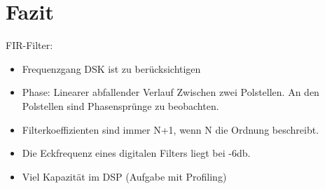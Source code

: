\section{Fazit}

FIR-Filter:
\begin{itemize}
	\item Frequenzgang DSK ist zu berücksichtigen
\item Phase: Linearer abfallender Verlauf Zwischen zwei Polstellen. An den Polstellen sind Phasensprünge zu beobachten.
\item Filterkoeffizienten sind immer N+1, wenn N die Ordnung beschreibt.
\item Die Eckfrequenz eines digitalen Filters liegt bei -6db.
\item Viel Kapazität im DSP (Aufgabe mit Profiling)
\end{itemize}